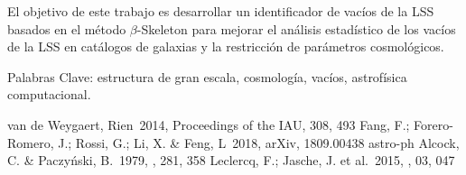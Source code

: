 \documentclass[manuscript]{aastex62}
\begin{document}
  El objetivo de este trabajo es desarrollar un identificador de vac\'ios
  de la LSS basados en el m\'etodo $\beta$-Skeleton para mejorar el an\'alisis
  estad\'istico de los vac\'ios de la LSS en cat\'alogos de galaxias
  y la restricci\'on de par\'ametros cosmol\'ogicos.

  \medskip

  Palabras Clave: estructura de gran escala, cosmolog\'ia, vac\'ios,
  astrof\'isica computacional.

\nocite{*}


\begin{thebibliography}{}                                                       

 van de Weygaert, Rien\ 2014, Proceedings of the IAU, 308, 493   
 Fang, F.; Forero-Romero, J.; Rossi, G.; Li, X. \& Feng, L\ 2018, arXiv, 1809.00438 astro-ph
 Alcock, C. \& Paczy\'nski, B.\ 1979, \nat, 281, 358
 Leclercq, F.; Jasche, J. et al.\ 2015, \jcap, 03, 047
                                                                                
\end{thebibliography}                                                           
                       

\end{document}
